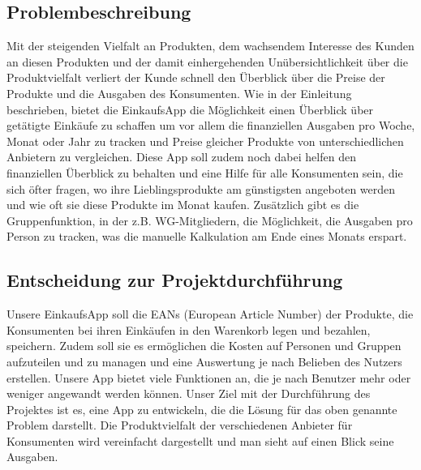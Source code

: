 \documentclass[12pt,a4paper]{article}
\begin{document}
\subsection{Problembeschreibung}
Mit der steigenden Vielfalt an Produkten, dem wachsendem Interesse des Kunden an diesen Produkten und der damit einhergehenden Unübersichtlichkeit über die Produktvielfalt verliert der Kunde schnell den Überblick über die Preise der Produkte und die Ausgaben des Konsumenten. 
Wie in der Einleitung beschrieben, bietet die EinkaufsApp die Möglichkeit einen Überblick über getätigte Einkäufe zu schaffen um vor allem die finanziellen Ausgaben pro Woche, Monat oder Jahr zu tracken und Preise gleicher Produkte von unterschiedlichen Anbietern zu vergleichen.  
Diese App soll zudem noch dabei helfen den finanziellen Überblick zu behalten und eine Hilfe für alle Konsumenten sein, die sich öfter fragen, wo ihre Lieblingsprodukte am günstigsten angeboten werden und wie oft sie diese Produkte im Monat kaufen.
Zusätzlich gibt es die Gruppenfunktion, in der z.B. WG-Mitgliedern, die Möglichkeit, die Ausgaben pro Person zu tracken, was die manuelle Kalkulation am Ende eines Monats erspart. 

\subsection{Entscheidung zur Projektdurchführung}
Unsere EinkaufsApp soll die EANs (European Article Number) der Produkte, die Konsumenten bei ihren Einkäufen in den Warenkorb legen und bezahlen, speichern.
Zudem soll sie es ermöglichen die Kosten auf Personen und Gruppen aufzuteilen und zu managen und eine Auswertung je nach Belieben des Nutzers erstellen.
Unsere App bietet viele Funktionen an, die je nach Benutzer mehr oder weniger angewandt werden können.
Unser Ziel mit der Durchführung des Projektes ist es, eine App zu entwickeln, die die Lösung für das oben genannte Problem darstellt. 
Die Produktvielfalt der verschiedenen Anbieter für Konsumenten wird vereinfacht dargestellt und man sieht auf einen Blick seine Ausgaben.

\newpage
\end{document}
